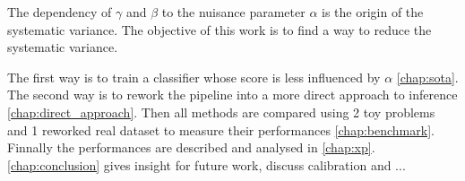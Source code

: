 The dependency of $\gamma$ and $\beta$ to the nuisance parameter $\alpha$ is the origin of the systematic variance.
The objective of this work is to find a way to reduce the systematic variance.

The first way is to train a classifier whose score is less influenced by $\alpha$ \autoref{chap:sota}.
The second way is to rework the pipeline into a more direct approach to inference \autoref{chap:direct_approach}.
Then all methods are compared using 2 toy problems and 1 reworked real dataset to measure their performances \autoref{chap:benchmark}.
Finnally the performances are described and analysed in \autoref{chap:xp}.
\autoref{chap:conclusion} gives insight for future work, discuss calibration and ...


